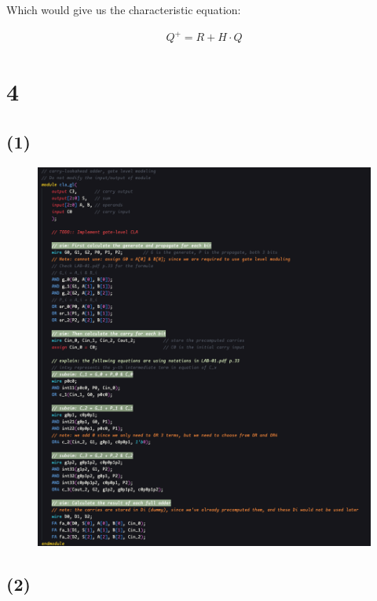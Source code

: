 \documentclass{article}
\begin{document}
Which would give us the characteristic equation:

\begin{align*}
    Q^+ = R + H \cdot Q
\end{align*}

\section*{4}

\subsection*{(1)}

\begin{figure}[H]
    \centering
    \includegraphics[width=1\textwidth]{4_1_clagl.png}
\end{figure}

\subsection*{(2)}
\end{document}

